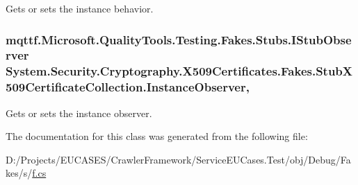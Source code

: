 Gets or sets the instance behavior.

\hypertarget{class_system_1_1_security_1_1_cryptography_1_1_x509_certificates_1_1_fakes_1_1_stub_x509_certificate_collection_a3f1004f43101b583ef9dd2fb8a7c59c2}{
\subsubsection[{Instance\-Observer}]{\setlength{\rightskip}{0pt plus 5cm}mqttf.\-Microsoft.\-Quality\-Tools.\-Testing.\-Fakes.\-Stubs.\-I\-Stub\-Observer System.\-Security.\-Cryptography.\-X509\-Certificates.\-Fakes.\-Stub\-X509\-Certificate\-Collection.\-Instance\-Observer\hspace{0.3cm}{\ttfamily [get]}, {\ttfamily [set]}}}\label{class_system_1_1_security_1_1_cryptography_1_1_x509_certificates_1_1_fakes_1_1_stub_x509_certificate_collection_a3f1004f43101b583ef9dd2fb8a7c59c2}


Gets or sets the instance observer.



The documentation for this class was generated from the following file\-:\begin{DoxyCompactItemize}
\item 
D\-:/\-Projects/\-E\-U\-C\-A\-S\-E\-S/\-Crawler\-Framework/\-Service\-E\-U\-Cases.\-Test/obj/\-Debug/\-Fakes/s/\hyperlink{s_2f_8cs}{f.\-cs}\end{DoxyCompactItemize}
